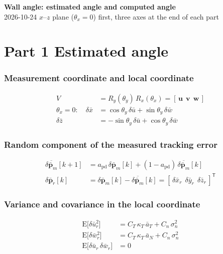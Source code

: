 \documentclass[11pt,a4paper]{ctexart}
\newcommand{\setline}[1]{\noindent{\small\textcolor[gray]{0.35}{#1}}\par\smallskip}
\newcommand{\ba}{\bar{a}}
\newcommand{\bx}{\bar{x}}
\newcommand{\bz}{\bar{z}}
\newcommand{\bu}{\bar{u}}
\newcommand{\bw}{\bar{w}}
\newcommand{\thy}{\theta_y}
\newcommand{\apd}{a_{\mathrm{pd}}}
\newcommand{\CK}{C_T\,\kappa_T}
\newcommand{\Cn}{C_n\,\sigma_n^2}
\newcommand{\E}{\mathrm{E}}
\newcommand{\dpb}{\delta\bar{\mathbf p}}
\begin{document}
\begin{center}\textbf{\large Wall angle: estimated angle and computed angle}\\[2pt]\small 2026-10-24 \quad $x$--$z$ plane ($\theta_x = 0$) first, three axes at the end of each part\end{center}

\part*{Part 1 \quad Estimated angle}

\section{Measurement coordinate and local coordinate}
\begin{align*}
V &= R_y(\thy)\,R_x(\theta_x) = [\,\mathbf u\ \ \mathbf v\ \ \mathbf w\,] \\
\theta_x = 0:\quad \delta\bx &= \cos\thy\,\delta\bu + \sin\thy\,\delta\bw \\
\delta\bz &= -\sin\thy\,\delta\bu + \cos\thy\,\delta\bw
\end{align*}

\section{Random component of the measured tracking error}
\begin{align*}
\overline{\dpb_m}[k+1] &= \apd\,\dpb_m[k] + (1-\apd)\,\overline{\dpb_m}[k] \\
\dpb_r[k] &= \dpb_m[k] - \overline{\dpb_m}[k] = [\,\delta\bx_r\ \ \delta\bar y_r\ \ \delta\bz_r\,]^{\mathsf T}
\end{align*}

\section{Variance and covariance in the local coordinate}
\setline{assumption: the random components along the wall and along the surface normal are uncorrelated}
\begin{align*}
\E\big[\delta\bu_r^2\big] &= \CK\,\ba_T + \Cn \\
\E\big[\delta\bw_r^2\big] &= \CK\,\ba_N + \Cn \\
\E\big[\delta\bu_r\,\delta\bw_r\big] &= 0
\end{align*}
\end{document}
